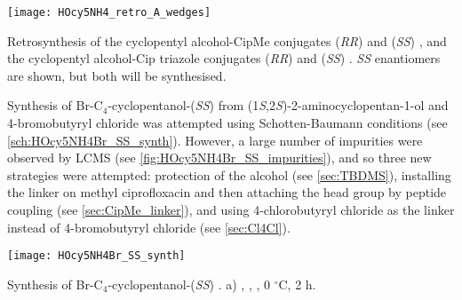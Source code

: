 \begin{scheme}[H]
	\begin{center}
		\texttt{[image: HOcy5NH4\_retro\_A\_wedges]}
		\caption{Retrosynthesis of the cyclopentyl alcohol-CipMe conjugates (\textit{RR})  and (\textit{SS}) , and the cyclopentyl alcohol-Cip triazole conjugates (\textit{RR})  and (\textit{SS}) . \textit{SS} enantiomers are shown, but both will be synthesised. \label{sch:HOcy5NH4_retro_A}}
	\end{center}
\end{scheme}

Synthesis of Br-C$_4$-cyclopentanol-(\textit{SS})  from (1\textit{S},2\textit{S})-2-aminocyclopentan-1-ol  and 4-bromobutyryl chloride  was attempted using Schotten-Baumann conditions (see \ref{sch:HOcy5NH4Br_SS_synth}). However, a large number of impurities were observed by LCMS (see \ref{fig:HOcy5NH4Br_SS_impurities}), and so three new strategies were attempted: protection of the alcohol (see \ref{sec:TBDMS}), installing the linker on methyl ciprofloxacin  and then attaching the head group by peptide coupling (see \ref{sec:CipMe_linker}), and using 4-chlorobutyryl chloride  as the linker instead of 4-bromobutyryl chloride  (see \ref{sec:Cl4Cl}).


\begin{scheme}[H]
	\begin{center}
		\texttt{[image: HOcy5NH4Br\_SS\_synth]}
		\caption{Synthesis of Br-C$_4$-cyclopentanol-(\textit{SS}) .
		a) , , , 0 $^{\circ}$C, 2 h. \label{sch:HOcy5NH4Br_SS_synth}}
	\end{center}
\end{scheme}

